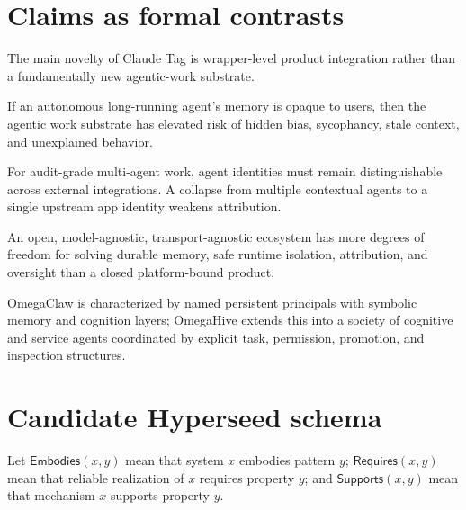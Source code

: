 \documentclass[11pt,a4paper]{article}
\begin{document}
\section{Claims as formal contrasts}

\begin{claim}
The main novelty of Claude Tag is wrapper-level product integration rather than a fundamentally new agentic-work substrate.
\end{claim}

\begin{claim}
If an autonomous long-running agent's memory is opaque to users, then the agentic work substrate has elevated risk of hidden bias, sycophancy, stale context, and unexplained behavior.
\end{claim}

\begin{claim}
For audit-grade multi-agent work, agent identities must remain distinguishable across external integrations. A collapse from multiple contextual agents to a single upstream app identity weakens attribution.
\end{claim}

\begin{claim}
An open, model-agnostic, transport-agnostic ecosystem has more degrees of freedom for solving durable memory, safe runtime isolation, attribution, and oversight than a closed platform-bound product.
\end{claim}

\begin{claim}
OmegaClaw is characterized by named persistent principals with symbolic memory and cognition layers; OmegaHive extends this into a society of cognitive and service agents coordinated by explicit task, permission, promotion, and inspection structures.
\end{claim}

\section{Candidate Hyperseed schema}
Let $\mathsf{Embodies}(x,y)$ mean that system $x$ embodies pattern $y$; $\mathsf{Requires}(x,y)$ mean that reliable realization of $x$ requires property $y$; and $\mathsf{Supports}(x,y)$ mean that mechanism $x$ supports property $y$.
\end{document}
